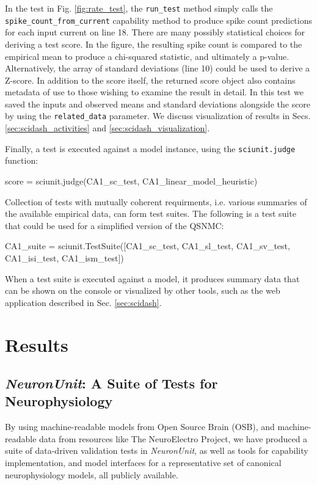 \documentclass[11pt,letterpaper]{article}
\let\verbx\lstinline
\begin{document}
In the test in Fig. \ref{fig:rate_test}, the \verbx{run_test} method simply calls the \verbx{spike_count_from_current} capability method to produce spike count predictions for each input current on line 18. 
There are many possibly statistical choices for deriving a test score.  
In the figure, the resulting spike count is compared to the empirical mean to produce a chi-squared statistic, and ultimately a p-value. 
Alternatively, the array of standard deviations (line 10) could be used to derive a Z-score.  
In addition to the score itself, the returned score object also contains metadata of use to those wishing to examine the result in detail. 
In this test we saved the inputs and observed means and standard deviations alongside the score by using the \verbx{related_data} parameter. 
We discuss visualization of results in Secs. \ref{sec:scidash_activities} and \ref{sec:scidash_visualization}.

Finally, a test is executed against a model instance, using the \verbx{sciunit.judge} function:
\begin{python}
score = sciunit.judge(CA1_sc_test, CA1_linear_model_heuristic)
\end{python}

Collection of tests with mutually coherent requirments, i.e. various summaries of the available empirical data, can form test suites.
The following is a test suite that could be used for a simplified version of the QSNMC:  
\begin{python}
CA1_suite = sciunit.TestSuite([CA1_sc_test, CA1_sl_test, CA1_sv_test, CA1_isi_test, CA1_ism_test])
\end{python}
When a test suite is executed against a model, it produces summary data that can be shown on the console or visualized by other tools, such as the web application described in Sec. \ref{sec:scidash}.

\section{Results}

\subsection{\textit{NeuronUnit}: A Suite of Tests for Neurophysiology}\label{sec:neuronunit}
By using machine-readable models from Open Source Brain (OSB), and machine-readable data from resources like The NeuroElectro Project\cite{neuroelectro_url}, we have produced a suite of data-driven validation tests in \textit{NeuronUnit}, as well as tools for capability implementation, and model interfaces for a representative set of canonical neurophysiology models, all publicly available. 
\end{document}
